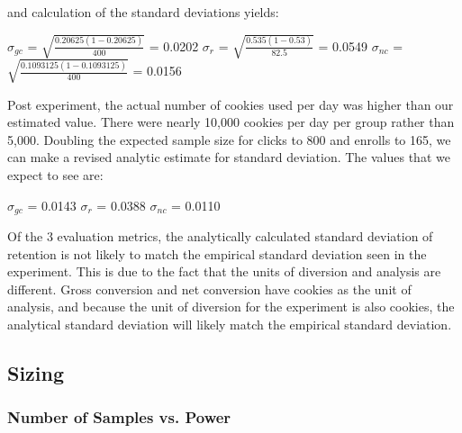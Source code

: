 \documentclass[paper=a4, fontsize=11pt]{scrartcl} %
\numberwithin{equation}{section} %
\numberwithin{figure}{section} %
\numberwithin{table}{section} %
\begin{document}
and calculation of the standard deviations yields: \newline

$\sigma_{gc}$ = $\sqrt{\frac{ 0.20625 (1 -  0.20625)}{400}}$ = 0.0202 \newline
$\sigma_{r}$ = $\sqrt{\frac{ 0.535 (1 -  0.53)}{82.5}}$ = 0.0549 \newline
$\sigma_{nc}$ = $\sqrt{\frac{ 0.1093125 (1 -  0.1093125)}{400}}$ = 0.0156
\newline

Post experiment, the actual number of cookies used per day was higher than our estimated value.  There were nearly 10,000 cookies per day per group rather than 5,000.  Doubling the expected sample size for clicks to 800 and enrolls to 165, we can make a revised analytic estimate for standard deviation.  The values that we expect to see are:
\newline

$\sigma_{gc}$ = 0.0143\newline
$\sigma_{r}$ = 0.0388\newline
$\sigma_{nc}$ = 0.0110
\newline

Of the 3 evaluation metrics, the analytically calculated standard deviation of retention is not likely to match the empirical standard deviation seen in the experiment.  This is due to the fact that the units of diversion and analysis are different.  Gross conversion and net conversion have cookies as the unit of analysis, and because the unit of diversion for the experiment is also cookies, the analytical standard deviation will likely match the empirical standard deviation. \newline


\subsection{Sizing}

\subsubsection{Number of Samples vs. Power}

\end{document}
